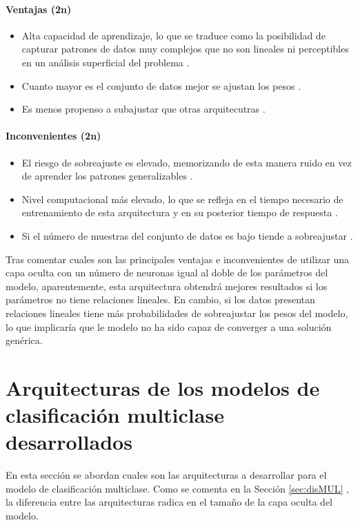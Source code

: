 \paragraph{Ventajas (2n)}
\begin{itemize}
	\item Alta capacidad de aprendizaje, lo que se traduce como la posibilidad de capturar patrones de datos muy complejos que no son lineales ni perceptibles en un análisis superficial del problema \cite{goodfellow2016deep}.
	\item Cuanto mayor es el conjunto de datos mejor se ajustan los pesos \cite{sun2017survey}.
	\item Es menos propenso a subajustar que otras arquitecutras \cite{bishop2006pattern}.
\end{itemize}
\paragraph{Inconvenientes (2n)}
\begin{itemize}
	\item El riesgo de sobreajuste es elevado, memorizando de esta manera ruido en vez de aprender los patrones generalizables \cite{bishop2006pattern}.
	\item Nivel computacional más elevado, lo que se refleja en el tiempo necesario de entrenamiento de esta arquitectura y en su posterior tiempo de respuesta \cite{goodfellow2016deep}.
	\item Si el número de muestras del conjunto de datos es bajo tiende a sobreajustar \cite{overfitting2008}.
\end{itemize}

Tras comentar cuales son las principales ventajas e inconvenientes de utilizar una capa oculta con un número de neuronas igual al doble de los parámetros del modelo, aparentemente, esta arquitectura obtendrá mejores resultados si los parámetros no tiene relaciones lineales. En cambio, si los datos presentan relaciones lineales tiene más probabilidades de sobreajustar los pesos del modelo, lo que implicaría que le modelo no ha sido capaz de converger a una solución genérica.




\section{Arquitecturas de los modelos de clasificación multiclase desarrollados}
En esta sección se abordan cuales son las arquitecturas a desarrollar para el modelo de clasificación multiclase. Como se comenta en la Sección \ref{sec:disMUL} , la diferencia entre las arquitecturas radica en el tamaño de la capa oculta del modelo.

